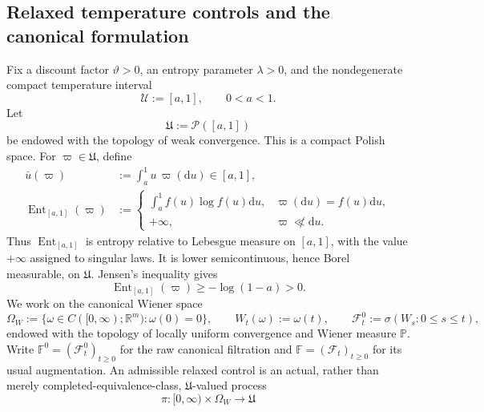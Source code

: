 \documentclass[11pt]{article}
\def\P{\mathbb{P}}
\def\R{\mathbb{R}}
\def\Fc{{\mathcal F}}
\def\Uc{{\mathcal U}}
\newcommand{\dd}{\mathrm{d}}
\newcommand{\Ent}{\operatorname{Ent}}
\theoremstyle{definition}
\theoremstyle{remark}
\numberwithin{equation}{section}
\begin{document}
\subsection{Relaxed temperature controls and the canonical formulation}\label{subsec:relaxed-controls}
Fix a discount factor $\vartheta>0$, an entropy parameter $\lambda>0$, and the nondegenerate compact
temperature interval
\begin{equation}\label{eq:temperature-range}
 \Uc:=[a,1],
 \qquad 0<a<1.
\end{equation}
Let
\begin{equation}\label{eq:relaxed-action-space}
 \mathfrak U:=\mathcal P([a,1])
\end{equation}
be endowed with the topology of weak convergence.  This is a compact Polish space.  For
$\varpi\in\mathfrak U$, define
\begin{align}
 \bar u(\varpi)&:=\int_a^1u\,\varpi(\dd u)\in[a,1],
 \label{eq:mean-action}\\
 \Ent_{[a,1]}(\varpi)&:=
 \begin{cases}
  \displaystyle\int_a^1 f(u)\log f(u)\dd u,
       &\varpi(\dd u)=f(u)\dd u,\\[1mm]
  +\infty,&\varpi\not\ll\dd u.
 \end{cases}
 \label{eq:entropy-action}
\end{align}
Thus $\Ent_{[a,1]}$ is entropy relative to Lebesgue measure on $[a,1]$, with the value $+\infty$
assigned to singular laws.  It is lower semicontinuous, hence Borel measurable, on $\mathfrak U$.
Jensen's inequality gives
\begin{equation}\label{eq:entropy-lower}
 \Ent_{[a,1]}(\varpi)\ge-\log(1-a)>0.
\end{equation}
We work on the canonical Wiener space
\begin{equation}\label{eq:canonical-Wiener-space}
 \Omega_W:=\{\omega\in C([0,\infty);\R^m):\omega(0)=0\},
 \qquad
 W_t(\omega):=\omega(t),
 \qquad
 \Fc_t^0:=\sigma(W_s:0\le s\le t),
\end{equation}
endowed with the topology of locally uniform convergence and Wiener measure $\P$.  Write
$\mathbb F^0=(\Fc_t^0)_{t\ge0}$ for the raw canonical filtration and $\mathbb F=(\Fc_t)_{t\ge0}$
for its usual augmentation.  An admissible relaxed control is an actual, rather than merely
completed-equivalence-class, $\mathfrak U$-valued process
\begin{equation}\label{eq:admissible-control-class}
 \pi:[0,\infty)\times\Omega_W\longrightarrow\mathfrak U
\end{equation}
\end{document}
